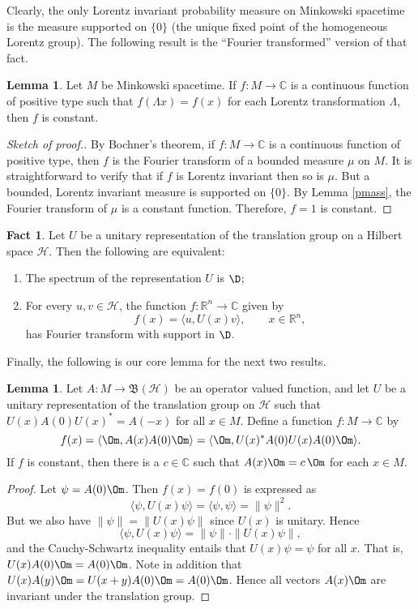 \documentclass[12pt]{article}
\newcommand{\norm}[1]{\| #1\|}
\newcommand{\bh}{\mathfrak{B}(\mathcal{H})}
\theoremstyle{definition}
\newtheorem{fact}[thm]{Fact}
\newtheorem{lemma}[thm]{Lemma}
\theoremstyle{definition}
\theoremstyle{remark}
\def\2#1{{\mathcal #1}}
\def\7#1{{\mathbb #1}}
\begin{document}
Clearly, the only Lorentz invariant probability measure on Minkowski
spacetime is the measure supported on $\{ 0\}$ (the unique fixed point
of the homogeneous Lorentz group).  The following result is the
``Fourier transformed'' version of that fact.

\begin{lemma} Let $M$ be Minkowski spacetime.  If $f:M\to \7C$ is a continuous
  function of positive type such that $f(\Lambda x)=f(x)$ for each Lorentz
  transformation $\Lambda$, then $f$ is constant. \label{constant}
\end{lemma}

\begin{proof}[Sketch of proof.] By Bochner's theorem, if $f:M\to \7C$ is a continuous
  function of positive type, then $f$ is the Fourier transform of a bounded measure
  $\mu$ on $M$.  It is straightforward to verify that if $f$ is Lorentz invariant
  then so is $\mu$.  But a bounded, Lorentz invariant measure is supported on $\{
  0\}$.  By Lemma \ref{pmass}, the Fourier transform of $\mu$ is a constant function.
  Therefore, $f=1$ is constant.
\end{proof}

\begin{fact} Let $U$ be a unitary representation of the translation group on a
  Hilbert space $\2H$.  Then the following are equivalent:
\begin{enumerate}
\item The spectrum of the representation $U$ is $\D$;
\item For every $u,v\in \2H$, the function $f:\7R ^n\to \7C$ given by
$$ f(x)=\langle u,U(x)v\rangle ,\qquad x\in \7R ^n ,$$
has Fourier transform with support in $\D$.
\end{enumerate}
\end{fact}

Finally, the following is our core lemma for the next two results.

\begin{lemma} Let $A:M\to \bh$ be an operator valued function, and let $U$ be a
  unitary representation of the translation group on $\2H$ such that
  $U(x)A(0)U(x)^*=A(-x)$ for all $x\in M$.  Define a function $f:M\to \7C$ by
$$ f(x)=\langle \Om ,A(x)A(0)\Om \rangle =\langle \Om ,U(x)^*A(0)U(x)A(0)\Om \rangle .$$
If $f$ is constant, then there is a $c\in \7C$ such that $A(x)\Om =c\,\Om$ for each
$x\in M$.  \label{two-point} \end{lemma}

\begin{proof} Let $\psi =A(0)\Om$.  Then $f(x)=f(0)$ is expressed as
$$\langle \psi ,U(x)\psi \rangle = \langle \psi ,\psi \rangle =\norm{\psi}^2 . $$
But we also have $\norm{\psi }=\norm{U(x)\psi}$ since $U(x)$ is unitary.  Hence
$$ \langle \psi ,U(x)\psi \rangle =\norm{\psi}\cdot \norm{U(x)\psi } ,$$
and the Cauchy-Schwartz inequality entails that $U(x)\psi =\psi$ for all $x$.  That
is, $U(x)A(0)\Om =A(0)\Om$.  Note in addition that $U(x)A(y)\Om = U(x+y)A(0)\Om
=A(0)\Om$.  Hence all vectors $A(x)\Om$ are invariant under the translation group.
\end{proof}
\end{document}
